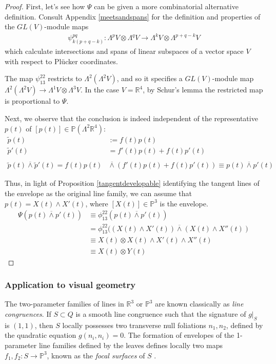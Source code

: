 \documentclass[12pt]{article}
\numberwithin{equation}{section}
\theoremstyle{plain}
\theoremstyle{definition}
\renewcommand{\P}{\mathbb{P}}
\renewcommand{\L}{\Lambda}
\newcommand{\GL}{GL}
\newcommand{\R}{\mathbb{R}}
\newcommand{\ra}{\rightarrow}
\begin{document}
\begin{proof}
First, let's see how $\Psi$ can be given a more combinatorial alternative definition. Consult Appendix \ref{meetsandspans} for the definition and properties of the $\GL(V)$-module maps
\begin{align*}
\psi^{pq}_{k(p+q-k)}:\L^{p}V\otimes \L^{q}V\ra \L^{k}V\otimes \L^{p+q-k}V
\end{align*}
which calculate intersections and spans of linear subspaces of a vector space $V$ with respect to Pl\"ucker coordinates.

The map $\psi^{22}_{13}$ restricts to $\L^{2}(\L^{2}V)$, and so it specifies a $\GL(V)$-module map $\L^{2}(\L^{2}V)\ra \L^{1}V\otimes \L^{3}V$. In the case $V=\R^{4}$, by Schur's lemma the restricted map is proportional to $\Psi$.

Next, we observe that the conclusion is indeed independent of the representative $p(t)$ of $[p(t)]\in \P(\L^{2}\R^{4})$:
\begin{align*}
\tilde{p}(t)&:=f(t)p(t)\\
\tilde{p}'(t)&=f'(t)p(t)+f(t)p'(t)\\
& \\
\tilde{p}(t)\overline{\wedge}\tilde{p}'(t)= f(t)p(t) &\overline{\wedge} (f'(t)p(t)+f(t)p'(t)) \equiv p(t)\overline{\wedge}p'(t)
\end{align*}

Thus, in light of Proposition \ref{tangentdevelopable} identifying the tangent lines of the envelope as the original line family, we can assume that $p(t)=X(t)\wedge X'(t)$, where $[X(t)]\in \P^{3}$ is the envelope.
\begin{align*}
\Psi(p(t)\overline{\wedge}p'(t))&\equiv\phi^{22}_{13}(p(t)\overline{\wedge}p'(t))\\
&=\phi^{22}_{13}((X(t)\wedge X'(t))\overline{\wedge}(X(t)\wedge X''(t))\\
&\equiv X(t)\otimes X(t)\wedge X'(t)\wedge X''(t)\\
&\equiv X(t)\otimes Y(t)
\end{align*}
\end{proof}
\subsubsection{Application to visual geometry}\label{structurefrommotion}

The two-parameter families of lines in $\R^{3}$ or $\P^{3}$ are known classically as \emph{line congruences}. If $S\subset Q$ is a smooth line congruence such that the signature of $g|_{S}$ is $(1,1)$, then $S$ locally possesses two transverse null foliations $n_{1},n_{2}$, defined by the quadratic equation $g(n_{i},n_{i})=0$. The formation of envelopes of the 1-parameter line families defined by the leaves defines locally two maps $f_{1},f_{2}:S\ra \P^{3}$, known as the \emph{focal surfaces} of $S$ \cite{hlavaty}.
\end{document}
